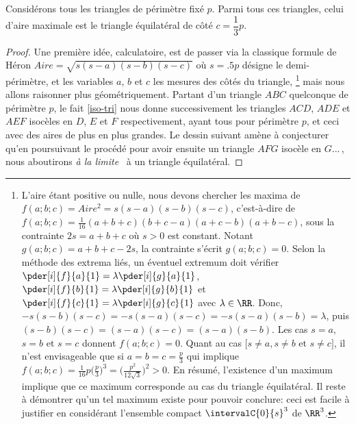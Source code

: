 \begin{fact}\label{iso-tri}
	Considérons tous les triangles de périmètre fixé $p$. Parmi tous ces triangles, celui d'aire maximale est le triangle équilatéral de côté $c = \dfrac13 p$.
\end{fact}


\begin{proof}
	Une première idée, calculatoire, est de passer via la classique formule de Héron $Aire = \sqrt{s(s - a)(s - b)(s - c)}$ où $s = \num{.5} p$ désigne le demi-périmètre, et les variables $a$, $b$ et $c$ les mesures des côtés du triangle,%
	\footnote{
		L'aire étant positive ou nulle, nous devons chercher les maxima de $f(a;b;c) = Aire^2 = s(s - a)(s - b)(s - c)$, c'est-à-dire de $f(a;b;c) = \frac{1}{16} (a + b + c)(b + c - a)(a + c - b)(a + b - c)$, sous la contrainte $2s = a + b + c$ où $s > 0$ est constant.
		Notant $g(a;b;c) = a + b + c - 2 s$, la contrainte s'écrit $g(a;b;c) = 0$.
		Selon la méthode des extrema liés, un éventuel extremum doit vérifier 
		$\pder[i]{f}{a}{1} = \lambda \pder[i]{g}{a}{1}$,
		$\pder[i]{f}{b}{1} = \lambda \pder[i]{g}{b}{1}$ et
		$\pder[i]{f}{c}{1} = \lambda \pder[i]{g}{c}{1}$
		avec $\lambda \in \RR$.
		Donc,
		$- s(s - b)(s - c) = - s(s - a)(s - c) = - s(s - a)(s - b) = \lambda$,
		puis
		$(s - b)(s - c) = (s - a)(s - c) = (s - a)(s - b)$.
		Les cas $s = a$, $s = b$ et $s = c$ donnent $f(a;b;c) = 0$.
		Quant au cas $\big[ s \neq a, s \neq b \text{ et } s \neq c \big]$, il n'est envisageable que si $a = b = c = \frac{p}{3}$ qui implique $f(a;b;c) = \frac{1}{16} p \big( \frac{p}{3} \big)^3 = \big( \frac{p^2}{12 \sqrt{3}} \big)^2 > 0$.
		En résumé, l'existence d'un maximum implique que ce maximum corresponde au cas du triangle équilatéral.
		Il reste à démontrer qu'un tel maximum existe pour pouvoir conclure: ceci est facile à justifier en considérant l'ensemble compact $\intervalC{0}{s}^3$ de $\RR^3$. 
	}
	mais nous allons raisonner plus géométriquement.
	Partant d'un triangle $ABC$ quelconque de périmètre $p$, le fait \ref{iso-tri} nous donne successivement les triangles $ACD$, $ADE$ et $AEF$ isocèles en $D$, $E$ et $F$ respectivement, ayant tous pour périmètre $p$, et ceci avec des aires de plus en plus grandes.  
	Le dessin suivant amène à conjecturer qu'en poursuivant le procédé pour avoir ensuite un triangle $AFG$ isocèle en $G$...\,, nous aboutirons \og \emph{à la limite} \fg\ à un triangle équilatéral.


\end{proof}
